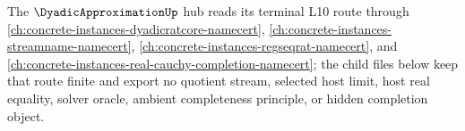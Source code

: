 The $\DyadicApproximationUp$ hub reads its terminal L10 route through \autoref{ch:concrete-instances-dyadicratcore-namecert}, \autoref{ch:concrete-instances-streamname-namecert}, \autoref{ch:concrete-instances-regseqrat-namecert}, and \autoref{ch:concrete-instances-real-cauchy-completion-namecert}; the child files below keep that route finite and export no quotient stream, selected host limit, host real equality, solver oracle, ambient completeness principle, or hidden completion object.



